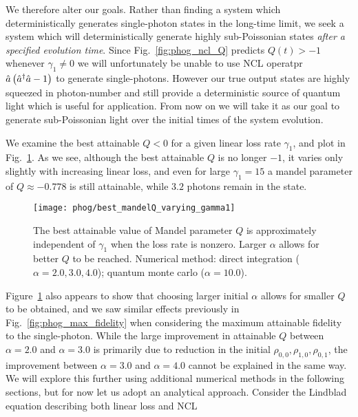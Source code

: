 We therefore alter our goals. Rather than finding a system which deterministically generates single-photon states in the long-time limit, we seek a system which will deterministically generate highly sub-Poissonian states \emph{after a specified evolution time}. Since Fig.~\ref{fig:phog_ncl_Q} predicts $Q\left(t\right) > -1$ whenever $\gamma_1 \ne 0$ we will unfortunately be unable to use NCL operatpr $\hat{a}\left(\hat{a}^\dagger \hat{a} - 1\right)$ to generate single-photons. However our true output states are highly squeezed in photon-number and still provide a deterministic source of quantum light which is useful for application. From now on we will take it as our goal to generate sub-Poissonian light over the initial times of the system evolution.


We examine the best attainable $Q<0$ for a given linear loss rate $\gamma_1$, and plot in Fig.~\ref{fig:phog_ncl_best_Q_gamma1}. As we see, although the best attainable $Q$ is no longer $-1$, it varies only slightly with increasing linear loss, and even for large $\gamma_1=15$ a mandel parameter of $Q \approx -0.778$ is still attainable, while $3.2$ photons remain in the state.


\begin{figure}
\centering
\texttt{[image: phog/best\_mandelQ\_varying\_gamma1]}
\caption{\label{fig:phog_ncl_best_Q_gamma1} The best attainable value of Mandel parameter $Q$ is approximately independent of $\gamma_1$ when the loss rate is nonzero. Larger $\alpha$ allows for better $Q$ to be reached. Numerical method: direct integration ($\alpha = 2.0, 3.0, 4.0$); quantum monte carlo ($\alpha = 10.0$). }
\end{figure}

Figure~\ref{fig:phog_ncl_best_Q_gamma1} also appears to show that choosing larger initial $\alpha$ allows for smaller $Q$ to be obtained, and we saw similar effects previously in Fig.~\ref{fig:phog_max_fidelity} when considering the maximum attainable fidelity to the single-photon. While the large improvement in attainable $Q$ between $\alpha=2.0$ and $\alpha=3.0$ is primarily due to reduction in the initial $\rho_{0, 0}, \rho_{1, 0}, \rho_{0, 1}$, the improvement between $\alpha=3.0$ and $\alpha=4.0$ cannot be explained in the same way. We will explore this further using additional numerical methods in the following sections, but for now let us adopt an analytical approach. Consider the Lindblad equation describing both linear loss and NCL

